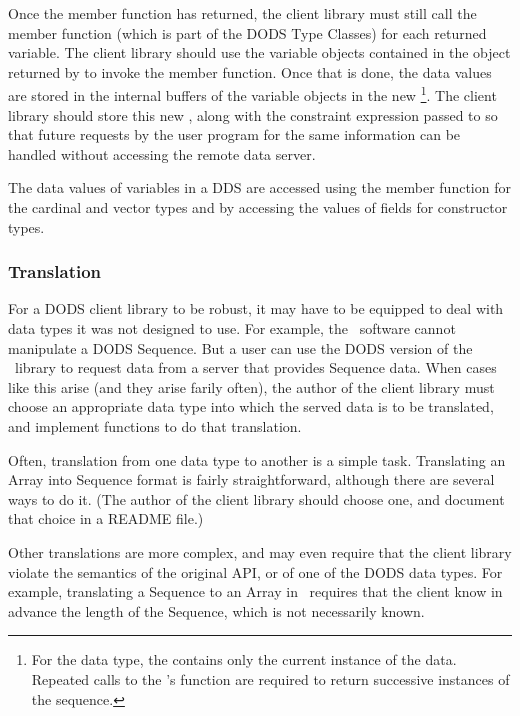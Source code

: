 Once the  member function has returned, the client
library must still call the  member function (which
is part of the DODS Type Classes) for each returned variable. The
client library should use the variable objects contained in the
 object returned by  to invoke the
 member function. Once that is done, the data values
are stored in the internal buffers of the variable objects in the new
\footnote{For the  data type, the
   contains only the current instance of the data.
  Repeated calls to the 's  function
  are required to return successive instances of the sequence.}. The
client library should store this new , along with the
constraint expression passed to  so that future
requests by the user program for the same information can be handled
without accessing the remote data server.

The data values of variables in a DDS are accessed using the
 member function for the cardinal and vector types and by
accessing the values of fields for constructor types.

\subsubsection{Translation}

For a DODS client library to be robust, it may have to be equipped to
deal with data types it was not designed to use.  For example, the
\netcdf\ software cannot manipulate a DODS Sequence.  But a user can
use the DODS version of the \netcdf\ library to request data from a
server that provides Sequence data.  When cases like this arise (and
they arise farily often), the author of the client library must choose
an appropriate data type into which the served data is to be
translated, and implement functions to do that translation.

Often, translation from one data type to another is a simple
task. Translating an Array into Sequence format is fairly
straightforward, although there are several ways to do it. (The
author of the client library should choose one, and document that
choice in a README file.)  

Other translations are more complex, and may even require that the
client library violate the semantics of the original API, or of one of
the DODS data types.  For example, translating a Sequence to an Array
in \netcdf\ requires that the client know in advance the length of the
Sequence, which is not necessarily known. 

